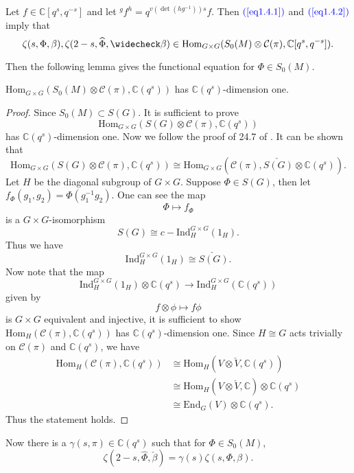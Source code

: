 Let $f\in \mathbb C[q^s,q^{-s}]$ and let $^g f ^h = q^{v(\det (hg^{-1}))s}f$. Then $\textcolor{blue}{(\ref{eq1.4.1})}$ and $\textcolor{blue}{(\ref{eq1.4.2})}$ imply that 
\[
\zeta(s,\Phi,\beta),\zeta(2-s,\widehat \Phi,\widecheck \beta)\in \mathrm {Hom}_{G\times G} (S_0(M) \otimes \mathcal C(\pi), \mathbb C[q^s,q^{-s}]).
\]

Then the following lemma gives the functional equation for $\Phi\in S_0(M)$.
\begin{lemma}
$\mathrm {Hom}_{G\times G} (S_0(M) \otimes \mathcal C(\pi), \mathbb C(q^s))$ has $\mathbb C(q^s)$-dimension one.
\end{lemma}

\begin{proof}
Since $S_0(M)\subset S(G)$. It is sufficient to prove 
\[
\mathrm {Hom}_{G\times G} (S(G) \otimes \mathcal C(\pi), \mathbb C(q^s))
\]
has $\mathbb C(q^s)$-dimension one. Now we follow the proof of  24.7 of . It can be shown that 
\[
\mathrm {Hom}_{G\times G} (S(G)\otimes \mathcal C(\pi), \mathbb C(q^s))\cong  \mathrm {Hom}_{G\times G} ( \mathcal C(\pi), \check {S(G)}\otimes \mathbb C(q^s)).
\]
Let $H$ be the diagonal subgroup of $G\times G$. Suppose $\Phi \in S(G)$, then let $f_\Phi(g_1,g_2) =\Phi(g_1^{-1} g_2)$. One can see the map 
\[ 
\Phi \mapsto f_\Phi
\]
is a $G\times G$-isomorphism
\[
S(G)\cong c-\mathrm {Ind} _{H} ^{G\times G} (1_H).
\]
Thus we have 
\[ 
\mathrm {Ind} _{H} ^{G\times G} (1_H)\cong \check {S(G)}.
\]
Now note that the map 
\[
\mathrm {Ind} _{H} ^{G\times G} (1_H)\otimes \mathbb C(q^s)\to \mathrm {Ind} _{H} ^{G\times G} (\mathbb C(q^s))
\] 
given by 
\[ 
f\otimes \phi \mapsto f\phi 
\] 
is $G\times G$ equivalent and injective, it is sufficient to show 
$\mathrm {Hom}_H( \mathcal C(\pi), \mathbb C(q^s))$ has $\mathbb C(q^s)$-dimension one. Since $H\cong G$ acts trivially on $\mathcal C(\pi)$ and $\mathbb C(q^s)$, we have 
\begin{equation*}
	\begin{split}
	\mathrm {Hom}_H( \mathcal C(\pi), \mathbb C(q^s))&\cong \mathrm {Hom}_H( V\otimes \check V, \mathbb C(q^s))\\
    &\cong \mathrm {Hom}_H( V\otimes \check V, \mathbb C)\otimes \mathbb C(q^s)\\
    &\cong \mathrm {End}_G( V)\otimes \mathbb C(q^s).
\end{split}
\end{equation*}
Thus the statement holds.
\end{proof}

Now there is a $\gamma(s,\pi) \in \mathbb C(q^s)$ such that for $\Phi\in S_0(M)$, 
\begin{equation}\label{eq1.4.3}
\zeta(2-s,\widehat \Phi, \check \beta) =\gamma(s)\zeta (s,\Phi,\beta).
\end{equation}

